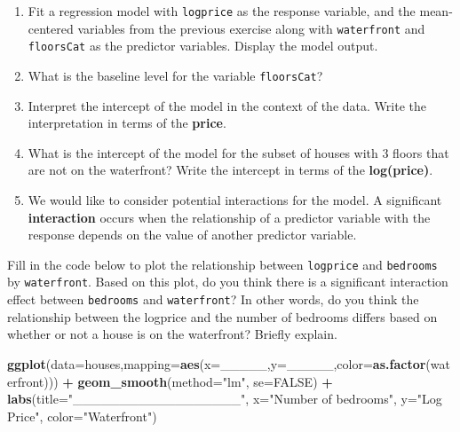 \documentclass[]{book}
\newenvironment{Shaded}{\begin{snugshade}}{\end{snugshade}}
\newcommand{\KeywordTok}[1]{\textcolor[rgb]{0.13,0.29,0.53}{\textbf{#1}}}
\newcommand{\DataTypeTok}[1]{\textcolor[rgb]{0.13,0.29,0.53}{#1}}
\newcommand{\StringTok}[1]{\textcolor[rgb]{0.31,0.60,0.02}{#1}}
\newcommand{\OtherTok}[1]{\textcolor[rgb]{0.56,0.35,0.01}{#1}}
\newcommand{\OperatorTok}[1]{\textcolor[rgb]{0.81,0.36,0.00}{\textbf{#1}}}
\newcommand{\NormalTok}[1]{#1}
\begin{document}
\begin{enumerate}
\def\labelenumi{\arabic{enumi}.}
\setcounter{enumi}{8}
\item
  Fit a regression model with \texttt{logprice} as the response
  variable, and the mean-centered variables from the previous exercise
  along with \texttt{waterfront} and \texttt{floorsCat} as the predictor
  variables. Display the model output.
\item
  What is the baseline level for the variable \texttt{floorsCat}?
\item
  Interpret the intercept of the model in the context of the data. Write
  the interpretation in terms of the \textbf{price}.
\item
  What is the intercept of the model for the subset of houses with 3
  floors that are not on the waterfront? Write the intercept in terms of
  the \textbf{log(price)}.
\item
  We would like to consider potential interactions for the model. A
  significant \textbf{interaction} occurs when the relationship of a
  predictor variable with the response depends on the value of another
  predictor variable.
\end{enumerate}

Fill in the code below to plot the relationship between
\texttt{logprice} and \texttt{bedrooms} by \texttt{waterfront}. Based on
this plot, do you think there is a significant interaction effect
between \texttt{bedrooms} and \texttt{waterfront}? In other words, do
you think the relationship between the logprice and the number of
bedrooms differs based on whether or not a house is on the waterfront?
Briefly explain.

\begin{Shaded}
\begin{Highlighting}[]
\KeywordTok{ggplot}\NormalTok{(}\DataTypeTok{data=}\NormalTok{houses,}\DataTypeTok{mapping=}\KeywordTok{aes}\NormalTok{(}\DataTypeTok{x=}\NormalTok{_____,}\DataTypeTok{y=}\NormalTok{_____,}\DataTypeTok{color=}\KeywordTok{as.factor}\NormalTok{(waterfront))) }\OperatorTok{+}
\StringTok{  }\KeywordTok{geom_smooth}\NormalTok{(}\DataTypeTok{method=}\StringTok{"lm"}\NormalTok{, }\DataTypeTok{se=}\OtherTok{FALSE}\NormalTok{) }\OperatorTok{+}
\StringTok{  }\KeywordTok{labs}\NormalTok{(}\DataTypeTok{title=}\StringTok{"__________________"}\NormalTok{, }
       \DataTypeTok{x=}\StringTok{"Number of bedrooms"}\NormalTok{, }
       \DataTypeTok{y=}\StringTok{"Log Price"}\NormalTok{,}
       \DataTypeTok{color=}\StringTok{"Waterfront"}\NormalTok{)}
\end{Highlighting}
\end{Shaded}
\end{document}
